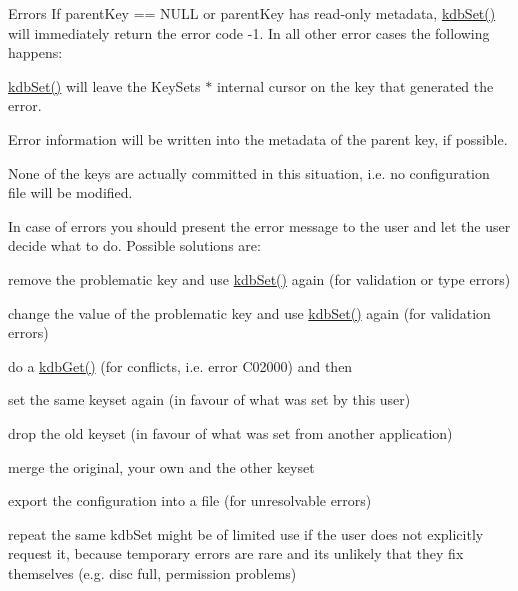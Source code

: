 \begin{DoxyParagraph}{Errors}
If {\ttfamily parent\+Key == N\+U\+LL} or {\ttfamily parent\+Key} has read-\/only metadata, \hyperlink{group__kdb_ga11436b058408f83d303ca5e996832bcf}{kdb\+Set()} will immediately return the error code -\/1. In all other error cases the following happens\+:
\begin{DoxyItemize}
\item \hyperlink{group__kdb_ga11436b058408f83d303ca5e996832bcf}{kdb\+Set()} will leave the Key\+Set\textquotesingle{}s $\ast$ internal cursor on the key that generated the error.
\item Error information will be written into the metadata of the parent key, if possible.
\item None of the keys are actually committed in this situation, i.\+e. no configuration file will be modified.
\end{DoxyItemize}
\end{DoxyParagraph}
In case of errors you should present the error message to the user and let the user decide what to do. Possible solutions are\+:
\begin{DoxyItemize}
\item remove the problematic key and use \hyperlink{group__kdb_ga11436b058408f83d303ca5e996832bcf}{kdb\+Set()} again (for validation or type errors)
\item change the value of the problematic key and use \hyperlink{group__kdb_ga11436b058408f83d303ca5e996832bcf}{kdb\+Set()} again (for validation errors)
\item do a \hyperlink{group__kdb_ga28e385fd9cb7ccfe0b2f1ed2f62453a1}{kdb\+Get()} (for conflicts, i.\+e. error C02000) and then
\begin{DoxyItemize}
\item set the same keyset again (in favour of what was set by this user)
\item drop the old keyset (in favour of what was set from another application)
\item merge the original, your own and the other keyset
\end{DoxyItemize}
\item export the configuration into a file (for unresolvable errors)
\item repeat the same kdb\+Set might be of limited use if the user does not explicitly request it, because temporary errors are rare and its unlikely that they fix themselves (e.\+g. disc full, permission problems)
\end{DoxyItemize}

